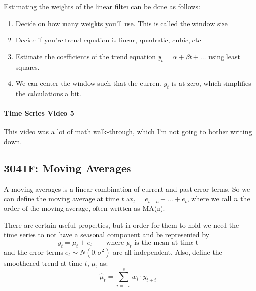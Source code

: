         Estimating the weights of the linear filter can be done as follows:
        \begin{enumerate} 
            \item Decide on how many weights you'll use. This is called the window size
            \item Decide if you're trend equation is linear, quadratic, cubic, etc.
            \item Estimate the coefficients of the trend equation $y_t = \alpha + \beta t + \dots$ using least squares.
            \item We can center the window such that the current $y_t$ is at zero, which simplifies the calculations a bit.
        \end{enumerate} 

        \paragraph{Time Series Video 5} This video was a lot of math walk-through, which I'm not going to bother writing down.


        \subsection{3041F: Moving Averages}
        A moving averages is a linear combination of current and past error terms.
        So we can define the moving average at time $t$ a$x_t = e_{t-n} + \dots + e_t$, 
        where we call $n$ the order of the moving average, often written as MA(n).

        There are certain useful properties, but in order for them to hold we need
        the time series to not have a seasonal component and be represented by
        \begin{equation*}
            y_t = \mu_t + e_t \qquad \text{where $\mu_t$ is the mean at time t}
        \end{equation*}
        and the error terms $e_t \sim N(0, \sigma^2)$ are all independent.
        Also, define the smoothened trend at time $t$, $\mu_t$ as:
        \begin{equation*}
            \hat{\mu}_t = \sum_{i = -s}^s w_i \cdot y_{t + i}
        \end{equation*}

